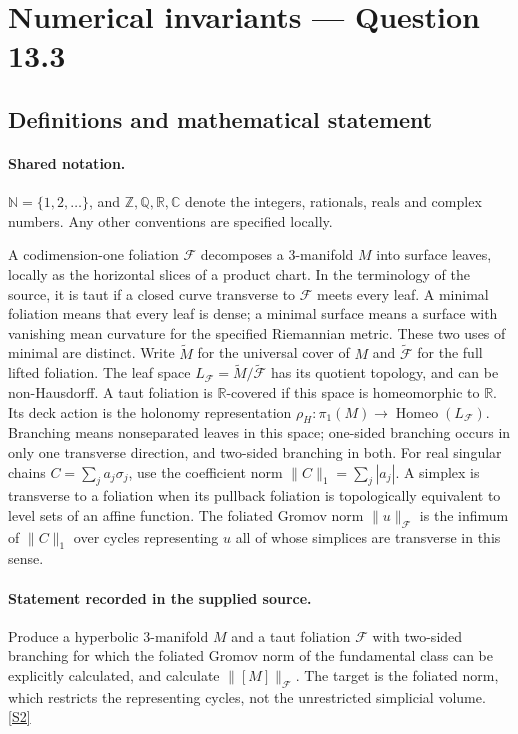 \documentclass[11pt]{article}
\newcommand{\sref}[2]{\hyperlink{source:#1:#2}{[S#2]}}
\begin{document}
\section{Numerical invariants — Question 13.3}\label{statement}

\subsection{Definitions and mathematical statement}

\paragraph{Shared notation.}$\mathbb N=\{1,2,\ldots\}$, and $\mathbb Z,\mathbb Q,\mathbb R,\mathbb C$ denote the integers, rationals, reals and complex numbers. Any other conventions are specified locally.


A codimension-one foliation $\mathcal F$ decomposes a $3$-manifold $M$ into surface leaves, locally as the horizontal slices of a product chart. In the terminology of the source, it is taut if a closed curve transverse to $\mathcal F$ meets every leaf. A minimal foliation means that every leaf is dense; a minimal surface means a surface with vanishing mean curvature for the specified Riemannian metric. These two uses of minimal are distinct. Write $\widetilde M$ for the universal cover of $M$ and $\widetilde{\mathcal F}$ for the full lifted foliation. The leaf space $L_{\mathcal F}=\widetilde M/\widetilde{\mathcal F}$ has its quotient topology, and can be non-Hausdorff. A taut foliation is $\mathbb R$-covered if this space is homeomorphic to $\mathbb R$. Its deck action is the holonomy representation $\rho_H:\pi_1(M)\longrightarrow\operatorname{Homeo}(L_{\mathcal F})$. Branching means nonseparated leaves in this space; one-sided branching occurs in only one transverse direction, and two-sided branching in both. For real singular chains $C=\sum_j a_j\sigma_j$, use the coefficient norm $\|C\|_1=\sum_j|a_j|$. A simplex is transverse to a foliation when its pullback foliation is topologically equivalent to level sets of an affine function. The foliated Gromov norm $\|u\|_{\mathcal F}$ is the infimum of $\|C\|_1$ over cycles representing $u$ all of whose simplices are transverse in this sense.
\paragraph{Statement recorded in the supplied source.}
Produce a hyperbolic $3$-manifold $M$ and a taut foliation $\mathcal F$ with two-sided branching for which the foliated Gromov norm of the fundamental class can be explicitly calculated, and calculate $\|[M]\|_{\mathcal F}$. The target is the foliated norm, which restricts the representing cycles, not the unrestricted simplicial volume. \sref{statement}{2}
\end{document}

